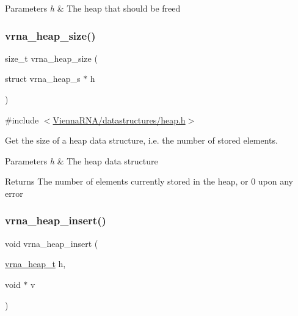 \begin{DoxyParams}{Parameters}
{\em h} & The heap that should be free\textquotesingle{}d \\
\hline
\end{DoxyParams}
\mbox{\label{group__heap__utils_ga5d84774d7d7f000ab05724d54984c2ed}} 
\subsubsection{\texorpdfstring{vrna\_heap\_size()}{vrna\_heap\_size()}}
{\footnotesize\ttfamily size\+\_\+t vrna\+\_\+heap\+\_\+size (\begin{DoxyParamCaption}\item[{struct vrna\+\_\+heap\+\_\+s $\ast$}]{h }\end{DoxyParamCaption})}



{\ttfamily \#include $<$\mbox{\hyperlink{heap_8h}{Vienna\+R\+N\+A/datastructures/heap.\+h}}$>$}



Get the size of a heap data structure, i.\+e. the number of stored elements. 


\begin{DoxyParams}{Parameters}
{\em h} & The heap data structure \\
\hline
\end{DoxyParams}
\begin{DoxyReturn}{Returns}
The number of elements currently stored in the heap, or 0 upon any error 
\end{DoxyReturn}
\mbox{\label{group__heap__utils_ga91cf0042c894de44c4eb7b47707260a8}} 
\subsubsection{\texorpdfstring{vrna\_heap\_insert()}{vrna\_heap\_insert()}}
{\footnotesize\ttfamily void vrna\+\_\+heap\+\_\+insert (\begin{DoxyParamCaption}\item[{\mbox{\hyperlink{group__heap__utils_ga341ea87a651145b986792f6eb3e679c3}{vrna\+\_\+heap\+\_\+t}}}]{h,  }\item[{void $\ast$}]{v }\end{DoxyParamCaption})}



